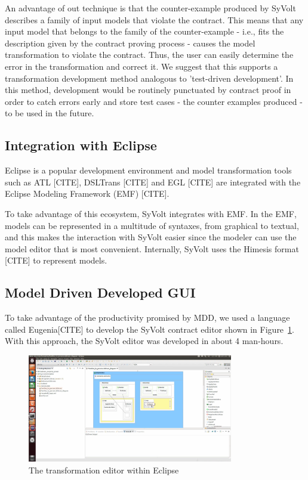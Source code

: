 An advantage of out technique is that the counter-example produced by SyVolt
describes a family of input models that violate the contract. This means that
any input model that belongs to the family of the counter-example - i.e., fits
the description given by the contract proving process - causes the model
transformation to violate the contract.  Thus, the user can easily determine the error in the
transformation and correct it. We suggest that this supports a transformation
development method analogous to 'test-driven development'. In this method,
development would be routinely punctuated by contract proof in order to catch
errors early and store test cases - the counter examples produced - to be used
in the future.


\subsection{Integration with Eclipse}

Eclipse is a popular development environment and model transformation
tools such as ATL [CITE], DSLTrans [CITE] and EGL [CITE] are integrated with the
Eclipse Modeling Framework (EMF) [CITE].

To take advantage of this ecosystem, SyVolt integrates with EMF.
In the EMF, models can be represented in a multitude of syntaxes, from graphical
to textual, and this makes the interaction with SyVolt easier since the modeler
can use the model editor that is most convenient. Internally, SyVolt uses 
the Himesis format [CITE] to represent models.

\subsection{Model Driven Developed GUI}
\label{sec:mdd_gui}

To take advantage of the productivity promised by MDD, we used a language called
Eugenia[CITE] to develop the SyVolt contract editor shown in
Figure~\ref{fig:eclipse_frontend}.
With this approach, the SyVolt editor was developed in about 4 man-hours.

\begin{figure}
\centering
\includegraphics[width=0.8\textwidth]{figures/eclipse_frontend}
\caption{The transformation editor within Eclipse}
\label{fig:eclipse_frontend}
\end{figure}




 